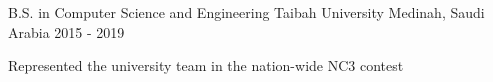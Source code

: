 

\begin{cventries}

  \cventry
    {B.S. in Computer Science and Engineering} %
    {Taibah University} %
    {Medinah, Saudi Arabia} %
    {2015 - 2019} %
    {
      \begin{cvitems} %
        \item {Represented the university team in the nation-wide NC3 contest}
      \end{cvitems}
    }

\end{cventries}
